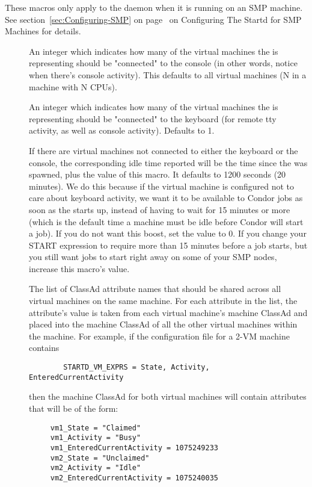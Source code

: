 These macros only apply to the  daemon when it is running on an
SMP machine. 
See section~\ref{sec:Configuring-SMP} on
page~\pageref{sec:Configuring-SMP} on Configuring The Startd for 
SMP Machines for details.

\begin{description}

\item[] 
\label{param:VirtualMachinesConnectedToConsole}
  An integer which indicates how many of the virtual
  machines the  is representing should be "connected" to the
  console (in other words, notice when there's console activity).
  This defaults to all virtual machines (N in a machine with N CPUs).

\item[]
\label{param:VirtualMachinesConnectedToKeyboard}
  An integer which indicates how many of the virtual
  machines the  is representing should be "connected" to the
  keyboard (for remote tty activity, as well as console activity).
  Defaults to 1.

\item[]
\label{param:DisconnectedKeyboardIdleBoost}
  If there are virtual machines not connected to either the keyboard
  or the console, the corresponding idle time reported will be the
  time since the  was spawned, plus the value of this macro.
  It defaults to 1200 seconds (20 minutes). 
  We do this because if the virtual machine is configured not to care
  about keyboard activity, we want it to be available to Condor jobs
  as soon as the  starts up, instead of having to wait for 15
  minutes or more (which is the default time a machine must be idle
  before Condor will start a job).
  If you do not want this boost, set the value to 0.  
  If you change your START expression to require more than 15 minutes
  before a job starts, but you still want jobs to start right away on
  some of your SMP nodes, increase this macro's value.

\item[]
\label{param:StartdVMExprs}
  The list of ClassAd attribute names that should be shared across all
  virtual machines on the same machine.
  For each attribute in the list, the attribute's value is taken from
  each virtual machine's machine ClassAd and placed into the machine
  ClassAd of all the other virtual machines within the machine.
  For example, if the configuration file for a 2-VM machine
  contains
\begin{verbatim}
        STARTD_VM_EXPRS = State, Activity, EnteredCurrentActivity
\end{verbatim}
  then the machine ClassAd for both virtual machines will contain
  attributes that will be of the form:
\begin{verbatim}
     vm1_State = "Claimed"
     vm1_Activity = "Busy"
     vm1_EnteredCurrentActivity = 1075249233
     vm2_State = "Unclaimed"
     vm2_Activity = "Idle"
     vm2_EnteredCurrentActivity = 1075240035
\end{verbatim}



\end{description}
